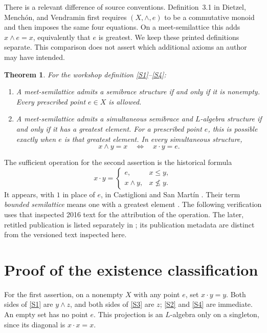 \documentclass[11pt]{article}
\newtheorem{theorem}{Theorem}
\newcommand{\meet}{\wedge}
\newcommand{\dotop}{\mathbin{\cdot}}
\begin{document}
There is a relevant difference of source conventions. Definition~3.1 in
Dietzel, Mench\'on, and Vendramin \cite{Enumeration} first requires
\((X,\meet,e)\) to be a commutative monoid and then imposes the same four
equations. On a meet-semilattice this adds \(x\meet e=x\), equivalently that
\(e\) is greatest. We keep these printed definitions separate. This
comparison does not assert which additional axioms an author may have
intended.

\begin{theorem}\label{main}
For the workshop definition \eqref{S1}--\eqref{S4}:
\begin{enumerate}
\item A meet-semilattice admits a semibrace structure if and only if it is
nonempty. Every prescribed point \(e\in X\) is allowed.
\item A meet-semilattice admits a simultaneous semibrace and \(L\)-algebra
structure if and only if it has a greatest element. For a prescribed point
\(e\), this is possible exactly when \(e\) is that greatest element. In
every simultaneous structure,
\[
x\meet y=x\quad\Longleftrightarrow\quad x\dotop y=e.
\]
\end{enumerate}
\end{theorem}

The sufficient operation for the second assertion is the historical formula
\begin{equation}\label{construction}
x\dotop y=
\begin{cases}
e,&x\leq y,\\
x\meet y,&x\not\leq y.
\end{cases}
\end{equation}
It appears, with \(1\) in place of \(e\), in Castiglioni and San Mart\'in
\cite[p.~7, Example~3.5(4)]{CastiglioniPreprint}. Their term
\emph{bounded semilattice} means one with a greatest element
\cite[p.~2]{CastiglioniPreprint}. The following verification uses that
inspected 2016 text for the attribution of the operation. The later,
retitled publication is listed separately in \cite{CastiglioniPublished};
its publication metadata are distinct from the versioned text inspected
here.

\section{Proof of the existence classification}

For the first assertion, on a nonempty \(X\) with any point \(e\), set
\(x\dotop y=y\). Both sides of \eqref{S1} are \(y\meet z\), and both sides of
\eqref{S3} are \(z\); \eqref{S2} and \eqref{S4} are immediate. An empty set
has no point \(e\). This projection is an \(L\)-algebra only on a singleton,
since its diagonal is \(x\dotop x=x\).
\end{document}
